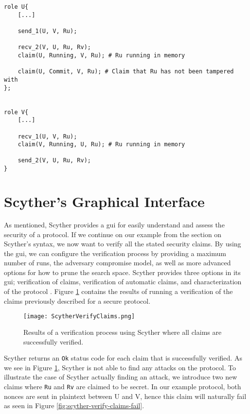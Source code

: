 \begin{lstlisting}
role U{
	[...]
	
	send_1(U, V, Ru);
	
	recv_2(V, U, Ru, Rv);
	claim(U, Running, V, Ru); # Ru running in memory
	
	claim(U, Commit, V, Ru); # Claim that Ru has not been tampered with
};


role V{
	[...]
	
	recv_1(U, V, Ru);
	claim(V, Running, U, Ru); # Ru running in memory
	
	send_2(V, U, Ru, Rv); 
}
\end{lstlisting}

\section{Scyther's Graphical Interface}


As mentioned, Scyther provides a \gls{gui} for easily understand and assess the security of a protocol. 
If we continue on our example from the section on Scyther's syntax, we now want to verify all the stated security claims. By using the \gls{gui}, we can configure the verification process by providing a maximum number of runs, the adversary compromise model, as well as more advanced options for how to prune the search space. Scyther provides three options in its \gls{gui}; verification of claims, verification of automatic claims, and characterization of the protocol \cite{cremers2008scyther}. Figure \ref{fig:scyther-verify-claims} contains the results of running a verification of the claims previously described for a secure protocol.

\begin{figure}[h]
	\centering
	\texttt{[image: ScytherVerifyClaims.png]}
	\caption{Results of a verification process using Scyther where all claims are successfully verified.}
	\label{fig:scyther-verify-claims}
\end{figure}


Scyther returns an \texttt{Ok} status code for each claim that is successfully verified. As we see in Figure \ref{fig:scyther-verify-claims}, Scyther is not able to find any attacks on the protocol. To illustrate the case of Scyther actually finding an attack, we introduce two new claims where \texttt{Ru} and \texttt{Rv} are claimed to be secret. In our example protocol, both nonces are sent in plaintext between U and V, hence this claim will naturally fail as seen in Figure \ref{fig:scyther-verify-claims-fail}.

